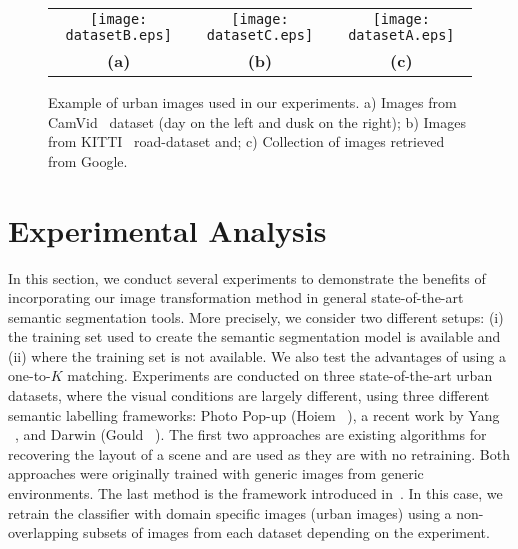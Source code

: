 \begin{figure}[!t]
\begin{center}
\begin{tabular}{ccc}
\hspace{-0.3cm}\texttt{[image: datasetB.eps]}&
\hspace{-0.4cm}\texttt{[image: datasetC.eps]}&
\hspace{-0.4cm}\texttt{[image: datasetA.eps]}\\
\textbf{(a)}&\textbf{(b)}&\textbf{(c)}\\
\end{tabular}
\caption[Example of urban images for driving scenes]{Example of urban images used in our experiments. a)
Images from CamVid~\cite{CamVidBBDD:PRL2008} dataset (day on the
left and dusk on the right); b) Images from
KITTI~\cite{Fritsch2013ITSC} road-dataset and; c) Collection of
images retrieved from Google.} \label{fig:datasets}
\end{center}
\vspace{-5mm}
\end{figure}
\section{Experimental Analysis}
\label{sec:experiments}

In this section, we conduct several experiments to demonstrate the
benefits of incorporating our image transformation method in general
state-of-the-art semantic segmentation tools. More precisely, we
consider two different setups: (i) the training set used to create
the semantic segmentation model is available and (ii) where the
training set is not available. We also test the advantages of
using a one-to-$K$ matching. Experiments are
conducted on three state-of-the-art urban datasets, where the
visual conditions are largely different, using three different
semantic labelling frameworks: Photo Pop-up (Hoiem
\etal~\cite{HoiemIJCV:2007}), a recent work by Yang
\etal~\cite{Make3dCVPR:2014}, and Darwin (Gould
\etal~\cite{DARWIN}). The first two approaches are existing
algorithms for recovering the layout of a scene and are used as
they are with no retraining. Both approaches were originally
trained with generic images from generic environments. The last
method is the framework introduced in~\cite{DARWIN}. In this case,
we retrain the classifier with domain specific images (urban
images) using a non-overlapping subsets of images from each
dataset depending on the experiment.



